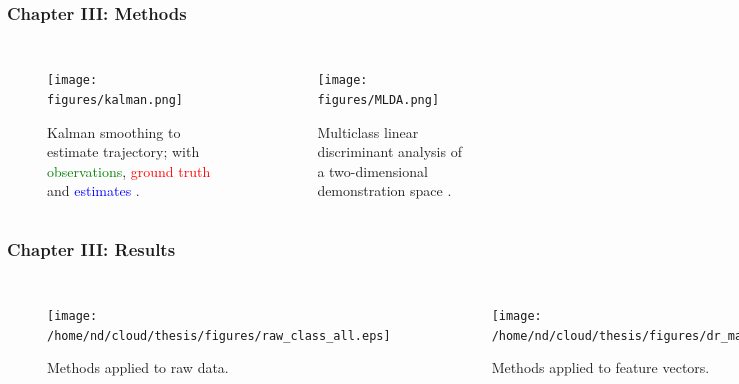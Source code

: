 \documentclass[aspectratio=169]{beamer}
\begin{document}

\begin{frame}[plain]
    \frametitle{Chapter III: Methods}
    \begin{columns}[t] 
        \begin{figure}
            \centering
            \texttt{[image: figures/kalman.png]}
            \caption{Kalman smoothing to estimate trajectory; with \textcolor{green}{observations},
                \textcolor{red}{ground truth} and \textcolor{blue}{estimates} \citep{barber2012bayesian}.}
        \end{figure}
        \begin{figure}
            \centering
            \texttt{[image: figures/MLDA.png]}
            \caption{Multiclass linear discriminant analysis of a two-dimensional demonstration space
            \citep{Bishop:2006:PRM:1162264}.}
        \end{figure}
    \end{columns}
\end{frame}


\begin{frame}[plain]
    \frametitle{Chapter III: Results}
    \begin{columns}[t] 
        \begin{figure}
            \centering
            \texttt{[image: /home/nd/cloud/thesis/figures/raw\_class\_all.eps]}
            \caption{Methods applied to raw data.}
        \end{figure}
        \begin{figure}
            \centering
            \texttt{[image: /home/nd/cloud/thesis/figures/dr\_main.eps]}
            \caption{Methods applied to feature vectors.}
        \end{figure}
    \end{columns}
\end{frame}
\end{document}
